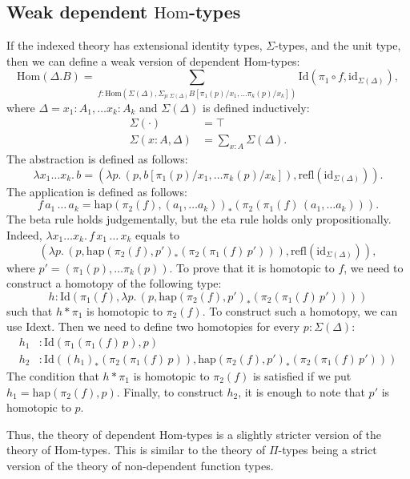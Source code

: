 \documentclass[reqno]{amsart}
\theoremstyle{definition}
\theoremstyle{remark}
\newcommand{\fs}[1]{\mathrm{#1}}
\newcommand{\Hom}{\fs{Hom}}
\newcommand{\Id}{\fs{Id}}
\newcommand{\refl}{\fs{refl}}
\newcommand{\id}{\fs{id}}
\numberwithin{figure}{section}
\begin{document}
\subsection{Weak dependent $\Hom$-types}

If the indexed theory has extensional identity types, $\Sigma$-types, and the unit type, then we can define a weak version of dependent $\Hom$-types:
\[ \Hom(\Delta.B) = \sum_{f : \Hom(\Sigma(\Delta),\Sigma_{p : \Sigma(\Delta)} B[\pi_1(p)/x_1, \ldots \pi_k(p)/x_k])} \Id(\pi_1 \circ f, \id_{\Sigma(\Delta)}), \]
where $\Delta = x_1 : A_1, \ldots x_k : A_k$ and $\Sigma(\Delta)$ is defined inductively:
\begin{align*}
\Sigma(\cdot) & = \top \\
\Sigma(x : A, \Delta) & = \sum_{x : A} \Sigma(\Delta).
\end{align*}
The abstraction is defined as follows:
\[ \lambda x_1 \ldots x_k.\,b = (\lambda p.\,(p, b[\pi_1(p)/x_1, \ldots \pi_k(p)/x_k]), \refl(\id_{\Sigma(\Delta)})). \]
The application is defined as follows:
\[ f\,a_1\,\ldots\,a_k = \fs{hap}(\pi_2(f),(a_1, \ldots a_k))_*(\pi_2(\pi_1(f)\,(a_1, \ldots a_k))). \]
The beta rule holds judgementally, but the eta rule holds only propositionally.
Indeed, $\lambda x_1 \ldots x_k.\,f\,x_1\,\ldots\,x_k$ equals to
\[ (\lambda p.\,(p,\fs{hap}(\pi_2(f),p')_*(\pi_2(\pi_1(f)\,p'))), \refl(\id_{\Sigma(\Delta)})), \]
where $p' = (\pi_1(p), \ldots \pi_k(p))$.
To prove that it is homotopic to $f$, we need to construct a homotopy of the following type:
\[ h : \Id(\pi_1(f), \lambda p.\,(p,\fs{hap}(\pi_2(f),p')_*(\pi_2(\pi_1(f)\,p')))) \]
such that $h * \pi_1$ is homotopic to $\pi_2(f)$.
To construct such a homotopy, we can use $\fs{Idext}$.
Then we need to define two homotopies for every $p : \Sigma(\Delta)$:
\begin{align*}
h_1 & : \Id(\pi_1(\pi_1(f)\,p),p) \\
h_2 & : \Id((h_1)_*(\pi_2(\pi_1(f)\,p)),\fs{hap}(\pi_2(f),p')_*(\pi_2(\pi_1(f)\,p')))
\end{align*}
The condition that $h * \pi_1$ is homotopic to $\pi_2(f)$ is satisfied if we put $h_1 = \fs{hap}(\pi_2(f),p)$.
Finally, to construct $h_2$, it is enough to note that $p'$ is homotopic to $p$.

Thus, the theory of dependent $\Hom$-types is a slightly stricter version of the theory of $\Hom$-types.
This is similar to the theory of $\Pi$-types being a strict version of the theory of non-dependent function types.
\end{document}
